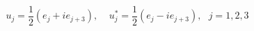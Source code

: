 \begin{equation}                      
u_{j} = \frac{1}{2} (e_{j} +i e_{j+3}) ,                      
~~~~~u_{j}^{*} = \frac{1}{2} (e_{j} -i e_{j+3}) , ~~~j=1,2,3                      
\end{equation} 
